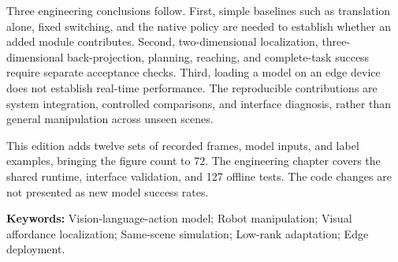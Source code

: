 Three engineering conclusions follow. First, simple baselines such as translation alone, fixed switching, and the native policy are needed to establish whether an added module contributes. Second, two-dimensional localization, three-dimensional back-projection, planning, reaching, and complete-task success require separate acceptance checks. Third, loading a model on an edge device does not establish real-time performance. The reproducible contributions are system integration, controlled comparisons, and interface diagnosis, rather than general manipulation across unseen scenes.

This edition adds twelve sets of recorded frames, model inputs, and label examples, bringing the figure count to 72. The engineering chapter covers the shared runtime, interface validation, and 127 offline tests. The code changes are not presented as new model success rates.

\noindent\textbf{Keywords:} Vision-language-action model; Robot manipulation; Visual affordance localization; Same-scene simulation; Low-rank adaptation; Edge deployment.
